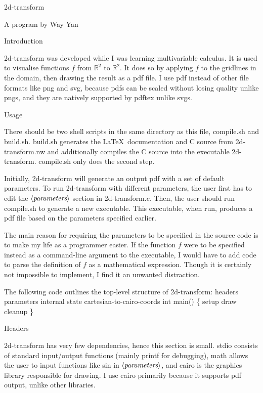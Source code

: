 \documentclass{article}%
\def\R{\mathbb{R}}
\def\refcode#1{$\langle\hbox{\em #1}\rangle$}
\def\heading#1{\noindent\bigbf #1 \rm\par\smallskip}
\begin{document}
\centerline{\biggrm 2d-transform}
\smallskip
\centerline{A program by Way Yan}
\bigskip

\heading{Introduction}
{\Tt{}2d-transform\nwendquote} was developed while I was learning multivariable calculus. It is used to visualise functions $f$ from $\R^2$ to $\R^2$. It does so by applying $f$ to the gridlines in the domain, then drawing the result as a pdf file. I use pdf instead of other file formats like png and svg, because pdfs can be scaled without losing quality unlike pngs, and they are natively supported by {\Tt{}pdftex\nwendquote} unlike svgs.
\bigskip

\nwenddocs{}\heading{Usage}
There should be two shell scripts in the same directory as this file, {\Tt{}compile.sh\nwendquote} and {\Tt{}build.sh\nwendquote}. {\Tt{}build.sh\nwendquote} generates the \LaTeX\ documentation and C source from {\Tt{}2d-transform.nw\nwendquote} and additionally compiles the C source into the executable {\Tt{}2d-transform\nwendquote}. {\Tt{}compile.sh\nwendquote} only does the second step.

Initially, {\Tt{}2d-transform\nwendquote} will generate an output pdf with a set of default parameters.  To run {\Tt{}2d-transform\nwendquote} with different parameters, the user first has to edit the \refcode{parameters} section in {\Tt{}2d-transform.c\nwendquote}. Then, the user should run {\Tt{}compile.sh\nwendquote} to generate a new executable. This executable, when run, produces a pdf file based on the parameters specified earlier.

The main reason for requiring the parameters to be specified in the source code is to make my life as a programmer easier. If the function $f$ were to be specified instead as a command-line argument to the executable, I would have to add code to parse the definition of $f$ as a mathematical expression. Though it is certainly not impossible to implement, I find it an unwanted distraction.

The following code outlines the top-level structure of {\Tt{}2d-transform\nwendquote}:
\nwenddocs{}\endmoddef\nwstartdeflinemarkup\nwenddeflinemarkup
\LA{}headers\RA{}
\LA{}parameters\RA{}
\LA{}internal state\RA{}
\LA{}cartesian-to-cairo-coords\RA{}
int main() \{
        \LA{}setup\RA{}
        \LA{}draw\RA{}
        \LA{}cleanup\RA{}
\}

\nwendcode{}\heading{Headers}
{\Tt{}2d-transform\nwendquote} has very few dependencies, hence this section is small. {\Tt{}stdio\nwendquote} consists of standard input/output functions (mainly {\Tt{}printf\nwendquote} for debugging), {\Tt{}math\nwendquote} allows the user to input functions like {\Tt{}sin\nwendquote} in \refcode{parameters}, and {\Tt{}cairo\nwendquote} is the graphics library responsible for drawing. I use {\Tt{}cairo\nwendquote} primarily because it supports pdf output, unlike other libraries.
\end{document}
